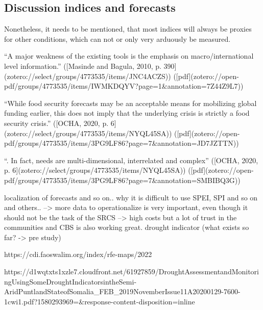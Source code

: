 \subsection{Discussion indices and forecasts}

Nonetheless, it needs to be mentioned, that most indices will always be proxies for other conditions, which can not or only very arduously be measured. 

“A major weakness of the existing tools is the emphasis on macro/international level information.” ([Masinde and Bagula, 2010, p. 390](zotero://select/groups/4773535/items/JNC4ACZS)) ([pdf](zotero://open-pdf/groups/4773535/items/IWMKDQYV?page=1&annotation=7Z44Z9L7))

“While food security forecasts may be an acceptable means for mobilizing global funding earlier, this does not imply that the underlying crisis is strictly a food security crisis.” ([OCHA, 2020, p. 6](zotero://select/groups/4773535/items/NYQL45SA)) ([pdf](zotero://open-pdf/groups/4773535/items/3PG9LF86?page=7&annotation=JD7JZTTN))

“. In fact, needs are multi-dimensional, interrelated and complex” ([OCHA, 2020, p. 6](zotero://select/groups/4773535/items/NYQL45SA)) ([pdf](zotero://open-pdf/groups/4773535/items/3PG9LF86?page=7&annotation=SMBIBQ3G))

localization of forecasts and so on.. why it is difficult to use SPEI, SPI and so on and others.. --> more data to operationalize is very important, even though it should not be the task of the SRCS --> high costs but a lot of trust in the communities and CBS is also working great.
drought indicator (what exists so far? -> pre study)

https://cdi.faoswalim.org/index/rfe-maps/2022

https://d1wqtxts1xzle7.cloudfront.net/61927859/DroughtAssessmentandMonitoringUsingSomeDroughtIndicatorsintheSemi-AridPuntlandStateofSomalia_FEB_2019NovemberIssue11A20200129-7600-1cwi1.pdf?1580293969=&response-content-disposition=inline%

